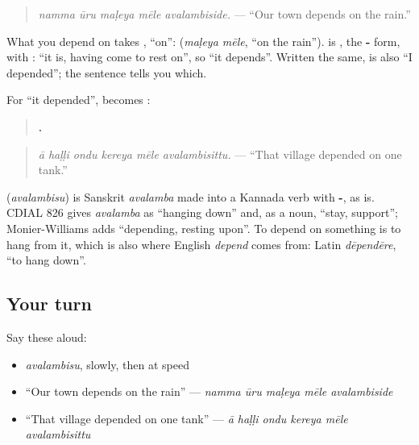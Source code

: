 \begin{quote}
\emph{namma ūru maḷeya mēle avalambiside.} — \textquotedblleft{}Our town depends on the rain.\textquotedblright{}
\end{quote}

What you depend on takes \textbf{}, \textquotedblleft{}on\textquotedblright{}: \textbf{ } (\emph{maḷeya mēle}, \textquotedblleft{}on the rain\textquotedblright{}). \textbf{} is \textbf{}, the \textbf{-} form, with \textbf{}: \textquotedblleft{}it is, having come to rest on\textquotedblright{}, so \textquotedblleft{}it depends\textquotedblright{}. Written the same, \textbf{} is also \textquotedblleft{}I depended\textquotedblright{}; the sentence tells you which.

For \textquotedblleft{}it depended\textquotedblright{}, \textbf{} becomes \textbf{}:

\begin{quote}
\textbf{     .}
\end{quote}

\begin{quote}
\emph{ā haḷḷi ondu kereya mēle avalambisittu.} — \textquotedblleft{}That village depended on one tank.\textquotedblright{}
\end{quote}

\begin{cousinweb}
\textbf{} (\emph{avalambisu}) is Sanskrit \emph{avalamba} made into a Kannada verb with \textbf{-}, as \textbf{} is. CDIAL 826 gives \emph{avalamba} as \textquotedblleft{}hanging down\textquotedblright{} and, as a noun, \textquotedblleft{}stay, support\textquotedblright{}; Monier-Williams adds \textquotedblleft{}depending, resting upon\textquotedblright{}. To depend on something is to hang from it, which is also where English \emph{depend} comes from: Latin \emph{dēpendēre}, \textquotedblleft{}to hang down\textquotedblright{}.
\end{cousinweb}

\subsection*{Your turn}
Say these aloud:

\begin{itemize}
\raggedright
  \item \emph{avalambisu}, slowly, then at speed
  \item \textquotedblleft{}Our town depends on the rain\textquotedblright{} — \emph{namma ūru maḷeya mēle avalambiside}
  \item \textquotedblleft{}That village depended on one tank\textquotedblright{} — \emph{ā haḷḷi ondu kereya mēle avalambisittu}
\end{itemize}

